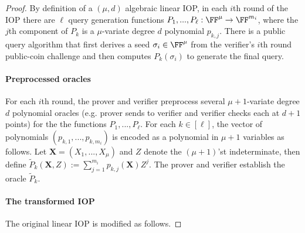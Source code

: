 \begin{proof}

By definition of a $(\mu, d)$ algebraic linear IOP, in each $i$th round of the IOP there are $\ell$ query generation functions $P_1,...,P_\ell: \FF^\mu \rightarrow \FF^{m_i}$, where the $j$th component of $P_k$ is a $\mu$-variate degree $d$ polynomial $p_{k,j}$. There is a public query algorithm that first derives a seed $\sigma_i \in \FF^\mu$ from the verifier's $i$th round public-coin challenge and then computes $P_k(\sigma_i)$ to generate the final query.

\paragraph{Preprocessed oracles} 
For each $i$th round, the prover and verifier preprocess several $\mu+1$-variate degree $d$ polynomial oracles (e.g. prover sends to verifier and verifier checks each at $d+1$ points) for the the functions $P_1,...,P_\ell$. 
For each $k \in [\ell]$, the vector of polynomials $(p_{k,1},...,p_{k, m_i})$ is encoded as a polynomial in $\mu + 1$ variables as follows. Let $\mathbf{X} = (X_1,...,X_\mu)$ and $Z$ denote the $(\mu+1)$'st indeterminate, then define $\tilde{P}_k(\mathbf{X}, Z) := \sum_{j=1}^{m_i} p_{k,j}(\mathbf{X}) Z^j$.
The prover and verifier establish the oracle $\tilde{P}_k$. 

\paragraph{The transformed IOP} 
The original linear IOP is modified as follows. 


\end{proof}
